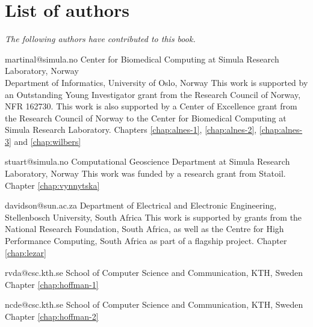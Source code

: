 \chapter*{List of authors}
\addtocounter{chapter}{1}
\vspace{-1cm}

\emph{The following authors have contributed to this book.}

\vspace{1cm}

             {martinal@simula.no}
             {Center for Biomedical Computing at Simula Research Laboratory, Norway \\
              Department of Informatics, University of Oslo, Norway}
             {This work is supported by an Outstanding Young
              Investigator grant from the Research Council of Norway,
              NFR 162730.
              This work is also supported by a Center of Excellence grant
              from the Research Council of Norway to the Center for
              Biomedical Computing at Simula Research Laboratory.}
             {Chapters
              \ref{chap:alnes-1},
              \ref{chap:alnes-2},
              \ref{chap:alnes-3} and
              \ref{chap:wilbers}}

             {stuart@simula.no}
             {Computational Geoscience Department at Simula Research Laboratory, Norway}
             {This work was funded by a research grant from Statoil.}
             {Chapter \ref{chap:vynnytska}}

             {davidson@sun.ac.za}
             {Department of Electrical and Electronic Engineering, Stellenbosch University, South Africa}
             {This work is supported by grants from the National Research
              Foundation, South Africa, as well as the Centre for High Performance
              Computing, South Africa as part of a flagship project.}
             {Chapter \ref{chap:lezar}}

             {rvda@csc.kth.se}
             {School of Computer Science and Communication, KTH, Sweden}
             {}
             {Chapter \ref{chap:hoffman-1}}

             {ncde@csc.kth.se}
             {School of Computer Science and Communication, KTH, Sweden}
             {}
             {Chapter \ref{chap:hoffman-2}}

